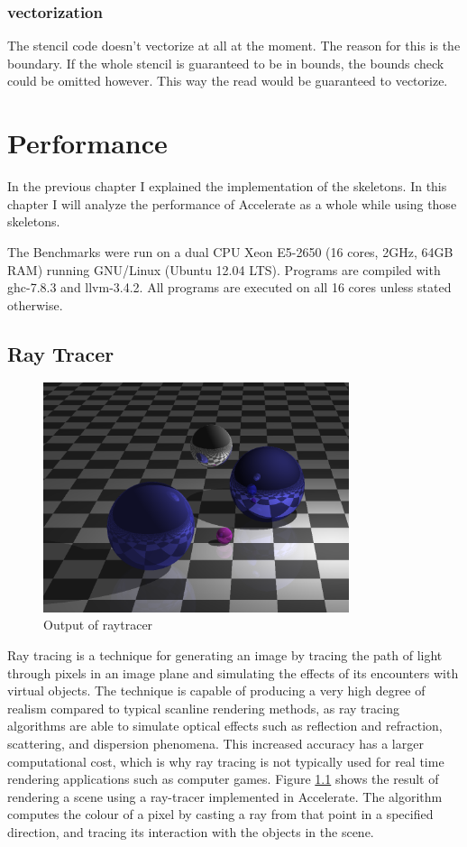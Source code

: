 \documentclass[a4paper,bibliography=totocnumbered,parskip,headsepline]{scrbook}
\begin{document}
\subsection*{vectorization}
The stencil code doesn't vectorize at all at the moment.
The reason for this is the boundary.
If the whole stencil is guaranteed to be in bounds, the bounds check could be omitted however.
This way the read would be guaranteed to vectorize.

\chapter{Performance}
In the previous chapter I explained the implementation of the skeletons.
In this chapter I will analyze the performance of Accelerate as a whole while using those skeletons.

The Benchmarks were run on a dual CPU Xeon E5-2650 (16 cores, 2GHz, 64GB RAM) running GNU/Linux (Ubuntu 12.04 LTS).
Programs are compiled with ghc-7.8.3 and llvm-3.4.2.
All programs are executed on all 16 cores unless stated otherwise.

\section{Ray Tracer}
\begin{figure}
    \centering
    \includegraphics[width=0.8\textwidth]{images/benchmarks/ray/ray_sample}
    \caption[Ray tracer]{Output of raytracer}
    \label{fig:ray_sample}
\end{figure}

Ray tracing is a technique for generating an image by tracing the path of light through pixels in an image plane and simulating the effects of its encounters with virtual objects.
The technique is capable of producing a very high degree of realism compared to typical scanline rendering methods, as ray tracing algorithms are able to simulate optical effects such as reflection and refraction, scattering, and dispersion phenomena.
This increased accuracy has a larger computational cost, which is why ray tracing is not typically used for real time rendering applications such as computer games.
Figure \ref{fig:ray_sample} shows the result of rendering a scene using a ray-tracer implemented in Accelerate.
The algorithm computes the colour of a pixel by casting a ray from that point in a specified direction, and tracing its interaction with the objects in the scene.
\end{document}
